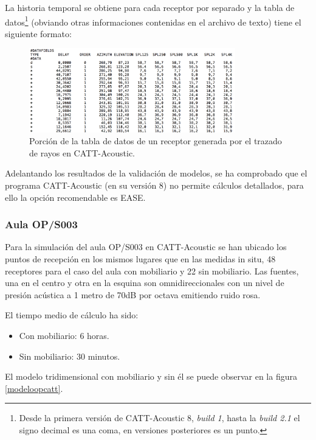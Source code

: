 La historia temporal se obtiene para cada receptor por separado y la tabla de datos\footnote{Desde la primera versión de CATT-Acoustic 8, \textit{build 1}, hasta la \textit{build 2.1} el signo decimal es una coma, en versiones posteriores es un punto.} (obviando otras informaciones contenidas en el archivo de texto) tiene el siguiente formato:

\begin{figure}[H]
    \centering
    \includegraphics[width=0.8\textwidth]{archivos/capturas/ismtxt.png}
    \caption{Porción de la tabla de datos de un receptor generada por el trazado de rayos en CATT-Acoustic.}
\end{figure}


Adelantando los resultados de la validación de modelos, se ha comprobado que el programa CATT-Acoustic (en su versión 8) no permite cálculos detallados, para ello la opción recomendable es EASE.

\subsubsection{Aula OP/S003}
\label{cattop}

Para la simulación del aula OP/S003 en CATT-Acoustic se han ubicado los puntos de recepción en los mismos lugares que en las medidas in situ, 48 receptores para el caso del aula con mobiliario y 22 sin mobiliario. Las fuentes, una en el centro y otra en la esquina son omnidireccionales con un nivel de presión acústica a 1 metro de 70dB por octava emitiendo ruido rosa.


El tiempo medio de cálculo ha sido:
\begin{itemize}
\itemsep0em
  \item Con mobiliario: 6 horas.
  \item Sin mobiliario: 30 minutos.
\end{itemize}


El modelo tridimensional con mobiliario y sin él se puede observar en la figura \ref{modeloopcatt}.

